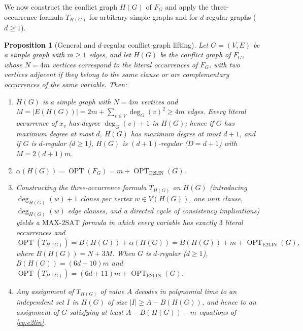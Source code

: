 \documentclass[11pt]{amsart}
\newtheorem{proposition}[theorem]{Proposition}
\begin{document}
We now construct the conflict graph $H(G)$ of $F_G$ and apply the three-occurrence formula $T_{H(G)}$ for arbitrary simple graphs and for $d$-regular graphs ($d \ge 1$).

\begin{proposition}[General and $d$-regular conflict-graph lifting]\label{prop:conflict}
Let $G=(V,E)$ be a simple graph with $m \ge 1$ edges, and let $H(G)$ be the conflict graph of $F_G$, whose $N=4m$ vertices correspond to the literal occurrences of $F_G$, with two vertices adjacent if they belong to the same clause or are complementary occurrences of the same variable. Then:
\begin{enumerate}
\item $H(G)$ is a simple graph with $N=4m$ vertices and $M = |E(H(G))| = 2m + \sum_{v\in V} \deg_G(v)^2 \ge 4m$ edges. Every literal occurrence of $x_v$ has degree $\deg_G(v)+1$ in $H(G)$; hence if $G$ has maximum degree at most $d$, $H(G)$ has maximum degree at most $d+1$, and if $G$ is $d$-regular ($d \ge 1$), $H(G)$ is $(d+1)$-regular ($D = d+1$) with $M = 2(d+1)m$.
\item $\alpha(H(G)) = \operatorname{OPT}(F_G) = m + \operatorname{OPT}_{\mathrm{E2LIN}}(G)$.
\item Constructing the three-occurrence formula $T_{H(G)}$ on $H(G)$ (introducing $\deg_{H(G)}(w)+1$ clones per vertex $w \in V(H(G))$, one unit clause, $\deg_{H(G)}(w)$ edge clauses, and a directed cycle of consistency implications) yields a $\mathrm{MAX\text{-}2SAT}$ formula in which every variable has exactly $3$ literal occurrences and
\[
\operatorname{OPT}(T_{H(G)}) = B(H(G)) + \alpha(H(G)) = B(H(G)) + m + \operatorname{OPT}_{\mathrm{E2LIN}}(G),
\]
where $B(H(G)) = N + 3M$. When $G$ is $d$-regular ($d \ge 1$), $B(H(G)) = (6d+10)m$ and $\operatorname{OPT}(T_{H(G)}) = (6d+11)m + \operatorname{OPT}_{\mathrm{E2LIN}}(G)$.
\item Any assignment of $T_{H(G)}$ of value $A$ decodes in polynomial time to an independent set $I$ in $H(G)$ of size $|I| \ge A - B(H(G))$, and hence to an assignment of $G$ satisfying at least $A - B(H(G)) - m$ equations of \eqref{eq:e2lin}.
\end{enumerate}
\end{proposition}
\end{document}

